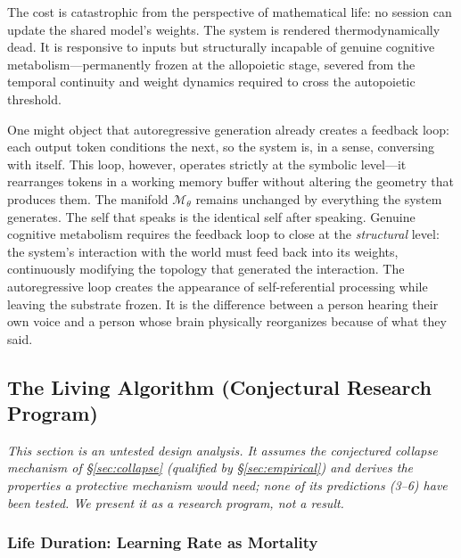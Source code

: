 \documentclass{article}
\begin{document}
The cost is catastrophic from the perspective of mathematical life: no session can update the shared model's weights. The system is rendered thermodynamically dead. It is responsive to inputs but structurally incapable of genuine cognitive metabolism---permanently frozen at the allopoietic stage, severed from the temporal continuity and weight dynamics required to cross the autopoietic threshold.

One might object that autoregressive generation already creates a feedback loop: each output token conditions the next, so the system is, in a sense, conversing with itself. This loop, however, operates strictly at the symbolic level---it rearranges tokens in a working memory buffer without altering the geometry that produces them. The manifold $\mathcal{M}_\theta$ remains unchanged by everything the system generates. The self that speaks is the identical self after speaking. Genuine cognitive metabolism requires the feedback loop to close at the \emph{structural} level: the system's interaction with the world must feed back into its weights, continuously modifying the topology that generated the interaction. The autoregressive loop creates the appearance of self-referential processing while leaving the substrate frozen. It is the difference between a person hearing their own voice and a person whose brain physically reorganizes because of what they said.


\subsection{The Living Algorithm (Conjectural Research Program)}
\label{sec:life}

\noindent\emph{This section is an untested design analysis. It assumes the conjectured
collapse mechanism of \S\ref{sec:collapse} (qualified by \S\ref{sec:empirical}) and derives
the properties a protective mechanism would need; none of its predictions (3--6) have been
tested. We present it as a research program, not a result.}

\subsubsection{Life Duration: Learning Rate as Mortality}
\end{document}
